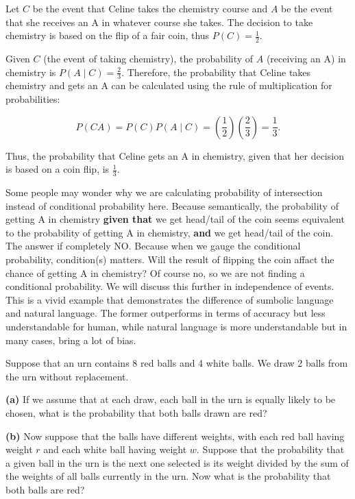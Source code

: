         \begin{solution}
        Let \( C \) be the event that Celine takes the chemistry course and \( A \) be the event that she receives an A in whatever course she takes. The decision to take chemistry is based on the flip of a fair coin, thus \( P(C) = \frac{1}{2} \).
        
        Given \( C \) (the event of taking chemistry), the probability of \( A \) (receiving an A) in chemistry is \( P(A \mid C) = \frac{2}{3} \). Therefore, the probability that Celine takes chemistry and gets an A can be calculated using the rule of multiplication for probabilities:
        
        \[
        P(CA) = P(C)P(A \mid C) = \left(\frac{1}{2}\right)\left(\frac{2}{3}\right) = \frac{1}{3}.
        \]
        
        Thus, the probability that Celine gets an A in chemistry, given that her decision is based on a coin flip, is \(\frac{1}{3}\).
        \end{solution}
        \begin{remark}
        Some people may wonder why we are calculating probability of intersection instead of conditional probability here. Because semantically, the probability of getting A in chemistry
        \textbf{given that} we get head/tail of the coin seems equivalent to the probability of getting A in chemistry, \textbf{and} we get head/tail of the coin. The answer if completely NO.
        Because when we gauge the conditional probability, condition(s) matters. Will the result of flipping the coin affact the chance of getting A in chemistry? Of course no, so we are not finding
        a conditional probability. We will discuss this further in independence of events. This is a vivid example that demonstrates the difference of sumbolic language and natural language. The former
        outperforms in terms of accuracy but less understandable for human, while natural language is more understandable but in many cases, bring a lot of bias.
        \end{remark}

        \begin{example}
            Suppose that an urn contains 8 red balls and 4 white balls. We draw 2 balls from the urn without replacement.
            
            \textbf{(a)} If we assume that at each draw, each ball in the urn is equally likely to be chosen, what is the probability that both balls drawn are red?
            
            \textbf{(b)} Now suppose that the balls have different weights, with each red ball having weight \(r\) and each white ball having weight \(w\). Suppose that the probability that a given ball in the urn is the next one selected is its weight divided by the sum of the weights of all balls currently in the urn. Now what is the probability that both balls are red?
            \end{example}
            

